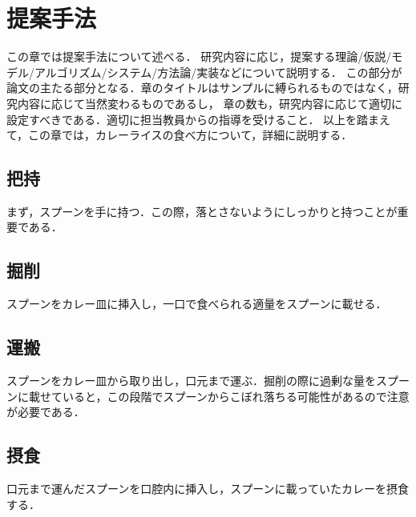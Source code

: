 \chapter{提案手法}	%

この章では提案手法について述べる．
研究内容に応じ，提案する理論/仮説/モデル/アルゴリズム/システム/方法論/実装などについて説明する．
この部分が論文の主たる部分となる．章のタイトルはサンプルに縛られるものではなく，研究内容に応じて当然変わるものであるし，
章の数も，研究内容に応じて適切に設定すべきである．適切に担当教員からの指導を受けること．
以上を踏まえて，この章では，カレーライスの食べ方について，詳細に説明する．

\section{把持}
まず，スプーンを手に持つ．この際，落とさないようにしっかりと持つことが重要である．

\section{掘削}
スプーンをカレー皿に挿入し，一口で食べられる適量をスプーンに載せる．

\section{運搬}
スプーンをカレー皿から取り出し，口元まで運ぶ．掘削の際に過剰な量をスプーンに載せていると，この段階でスプーンからこぼれ落ちる可能性があるので注意が必要である．

\section{摂食}
口元まで運んだスプーンを口腔内に挿入し，スプーンに載っていたカレーを摂食する．

